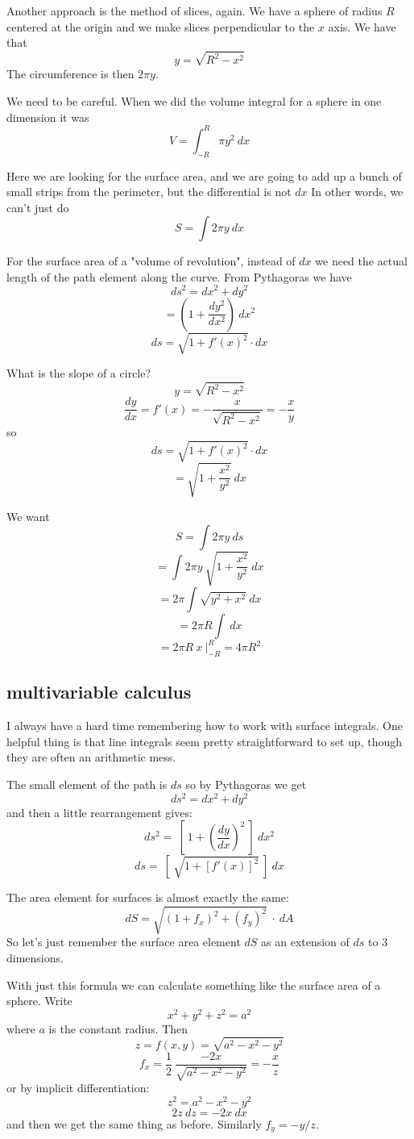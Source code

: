 \documentclass[11pt, oneside]{report}   	%
\begin{document}
Another approach is the method of slices, again.  We have a sphere of radius $R$ centered at the origin and we make slices perpendicular to the $x$ axis.  We have that 
\[ y = \sqrt{R^2 - x^2} \]
The circumference is then $2 \pi y$.

We need to be careful.  When we did the volume integral for a sphere in one dimension it was
\[ V = \int_{-R}^{R} \pi y^2 \ dx \]

Here we are looking for the surface area, and we are going to add up a bunch of small strips from the perimeter, but the differential is not $dx$  In other words, we can't just do
\[ S = \int  2 \pi y \ dx \]

For the surface area of a "volume of revolution", instead of $dx$ we need the actual length of the path element along the curve.  From Pythagoras we have 
\[ ds^2 = dx^2 + dy^2 \]
\[ = (1 + \frac{dy^2}{dx^2} ) \ dx^2 \]
\[ ds = \sqrt{1 + f'(x)^2} \cdot dx \]

What is the slope of a circle?
\[ y = \sqrt{R^2 - x^2} \]
\[ \frac{dy}{dx} = f'(x) = -\frac{x}{\sqrt{R^2 - x^2}}  = -\frac{x}{y}  \]
so
\[ ds = \sqrt{1 + f'(x)^2} \cdot dx \]
\[ = \sqrt{1 + \frac{x^2}{y^2}} \ dx \]

We want
\[ S = \int  2 \pi y \ ds \]
\[ = \int  2 \pi y \ \sqrt{1 + \frac{x^2}{y^2}} \ dx  \]
\[ = 2 \pi \int \sqrt{y^2 + x^2} \ dx \]
\[ = 2 \pi R \int \ dx \]
\[ = 2 \pi R \ x \ \bigg |_{-R}^R = 4 \pi R^2 \]

\subsection*{multivariable calculus}
I always have a hard time remembering how to work with surface integrals.  One helpful thing is that line integrals seem pretty straightforward to set up, though they are often an arithmetic mess.

The small element of the path is $ds$ so by Pythagoras we get 
\[ ds^2 = dx^2 + dy^2 \] 
and then a little rearrangement gives:
\[ ds^2 = \ [ \ 1 + (\frac{dy}{dx})^2 \ ] \ dx^2 \] 
\[ ds = \ [ \ \sqrt{1 + [f'(x)]^2} \ ] \ dx \]

The area element for surfaces is almost exactly the same:
\[ dS =  \sqrt{(1 + f_x)^2 + (f_y)^2} \  \cdot \ dA \]
So let's just remember the surface area element $dS$ as an extension of $ds$ to 3 dimensions.

With just this formula we can calculate something like the surface area of a sphere.  Write
\[ x^2 + y^2 + z^2 = a^2 \]
where $a$ is the constant radius.  Then
\[ z = f(x,y) = \sqrt{a^2 - x^2 - y^2} \]
\[ f_x = \frac{1}{2} \ \frac{-2x}{\sqrt{a^2 - x^2 - y^2}} = -\frac{x}{z} \]
or by implicit differentiation:
\[ z^2 = a^2 - x^2 - y^2 \]
\[ 2 z \ dz = - 2 x \ dx \]
and then we get the same thing as before.  Similarly $f_y = -y/z$.
\end{document}
